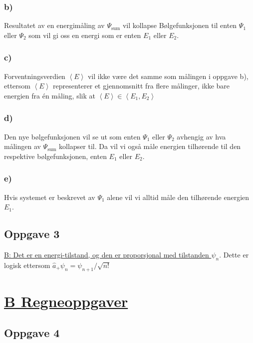 \documentclass{article}
\begin{document}
\subsubsection*{b)}
Resultatet av en energimåling av $Ψ_{\text{sum}}$ vil kollapse Bølgefunksjonen til enten $Ψ_1$ eller $Ψ_2$ som vil gi oss en energi som er enten $E_1$ eller $E_2$.

\subsubsection*{c)}
Forventningsverdien $\left<E\right>$ vil ikke være det samme som målingen i oppgave b), ettersom $\left<E\right>$ representerer et gjennomsnitt fra flere målinger, ikke bare energien fra én måling, slik at $\left<E\right> ∈ \left<E_1, E_2\right> $

\subsubsection*{d)}
Den nye bølgefunksjonen vil se ut som enten $Ψ_1$ eller $Ψ_2$ avhengig av hva målingen av $Ψ_{\text{sum}}$ kollapser til. Da vil vi også måle energien tilhørende til den respektive bølgefunksjonen, enten $E_1$ eller $E_2$. 
  
\subsubsection*{e)}
Hvis systemet er beskrevet av $Ψ_1$ alene vil vi alltid måle den tilhørende energien $E_1$. 

\subsection*{Oppgave 3}
\underline{B: Det er en energi-tilstand, og den er proporsjonal med tilstanden $ψ_n$}. 
Dette er logisk ettersom $\hat{a}_{+}ψ_n = ψ_{n+1} /\sqrt{n!} $

\section*{\underline{B Regneoppgaver}}
\subsection*{Oppgave 4}
\end{document}
